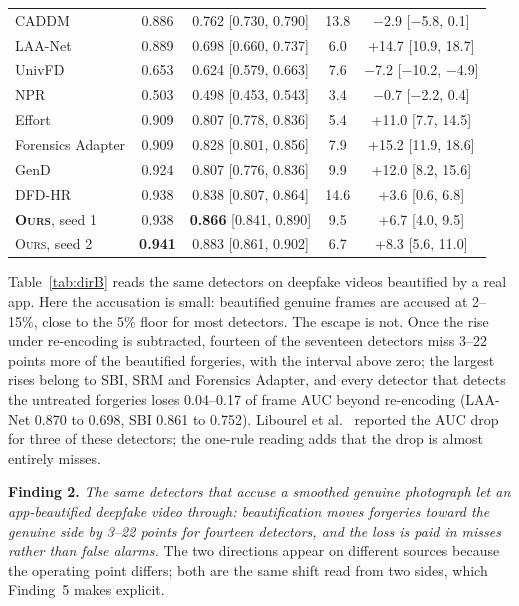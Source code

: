 \documentclass[conference]{IEEEtran}
\newcommand{\ours}{\textsc{Ours}}
\begin{document}
\begin{table}[t]
\begin{tabular}{@{}l c c c c@{}}
CADDM & 0.886 & 0.762 [0.730, 0.790] & 13.8 & $-$2.9 [$-$5.8, 0.1] \\
LAA-Net & 0.889 & 0.698 [0.660, 0.737] & 6.0 & +14.7 [10.9, 18.7] \\
UnivFD & 0.653 & 0.624 [0.579, 0.663] & 7.6 & $-$7.2 [$-$10.2, $-$4.9] \\
NPR & 0.503 & 0.498 [0.453, 0.543] & 3.4 & $-$0.7 [$-$2.2, 0.4] \\
Effort & 0.909 & 0.807 [0.778, 0.836] & 5.4 & +11.0 [7.7, 14.5] \\
Forensics Adapter & 0.909 & 0.828 [0.801, 0.856] & 7.9 & +15.2 [11.9, 18.6] \\
GenD & 0.924 & 0.807 [0.776, 0.836] & 9.9 & +12.0 [8.2, 15.6] \\
DFD-HR & 0.938 & 0.838 [0.807, 0.864] & 14.6 & +3.6 [0.6, 6.8] \\
\midrule
\textbf{\ours{}}, seed 1 & 0.938 & \textbf{0.866} [0.841, 0.890] & 9.5 & +6.7 [4.0, 9.5] \\
\ours{}, seed 2 & \textbf{0.941} & 0.883 [0.861, 0.902] & 6.7 & +8.3 [5.6, 11.0] \\
\bottomrule
\end{tabular}
\end{table}

Table~\ref{tab:dirB} reads the same detectors on deepfake videos beautified by a real app. Here the accusation is small:
beautified genuine frames are accused at 2--15\%, close to the 5\% floor for most detectors.
The escape is not. Once the rise under re-encoding is subtracted, fourteen of the seventeen detectors miss 3--22 points
more of the beautified forgeries, with the interval above zero;
the largest rises belong to SBI, SRM and Forensics Adapter, and every detector that detects the untreated forgeries loses
0.04--0.17 of frame AUC beyond re-encoding (LAA-Net 0.870 to 0.698, SBI 0.861 to 0.752).
Libourel et al.~\cite{libourel2024} reported the AUC drop for three of these detectors; the one-rule reading adds that the
drop is almost entirely misses.

\textbf{Finding 2.} \emph{The same detectors that accuse a smoothed genuine photograph let an app-beautified deepfake video
through: beautification moves forgeries toward the genuine side by 3--22 points for fourteen detectors, and the loss is paid
in misses rather than false alarms.} The two directions appear on different sources because the operating point differs; both are the same shift read from two
sides, which Finding~5 makes explicit.
\end{document}
